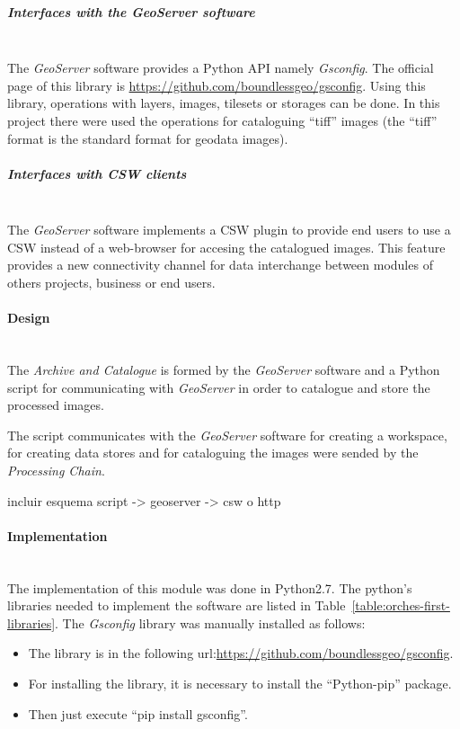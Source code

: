 \subparagraph{Interfaces with the GeoServer software}~\\

The \emph{GeoServer} software provides a Python \ac{API} namely
\emph{Gsconfig}. The official page of this library is
\url{https://github.com/boundlessgeo/gsconfig}. Using this library, operations
with layers, images, tilesets or storages can be done. In this project there
were used the operations for cataloguing ``tiff'' images (the ``tiff'' format is
the standard format for geodata images).

\subparagraph{Interfaces with CSW clients}~\\

The \emph{GeoServer} software implements a \ac{CSW} plugin to provide end users
to use a \ac{CSW} instead of a web-browser for accesing the catalogued images.
This feature provides a new connectivity channel for data interchange between
modules of others projects, business or end users.

\paragraph{Design}~\\

The \emph{Archive and Catalogue} is formed by the \emph{GeoServer} software and
a Python script for communicating with \emph{GeoServer} in order to catalogue
and store the processed images.

The script communicates with the \emph{GeoServer} software for creating a
workspace, for creating data stores and for cataloguing the images were sended
by the \emph{Processing Chain}. 


incluir esquema script -> geoserver -> csw o http

\paragraph{Implementation}~\\

The implementation of this module was done in Python2.7. The python's libraries
needed to implement the software are listed in Table~\ref{table:orches-first-libraries}.
The \emph{Gsconfig} library was manually installed as follows:
\begin{itemize}
\item The library is in the following
  url:\url{https://github.com/boundlessgeo/gsconfig}.
\item For installing the library, it is necessary to install the ``Python-pip''
  package.
\item Then just execute ``pip install gsconfig''.
\end{itemize}

